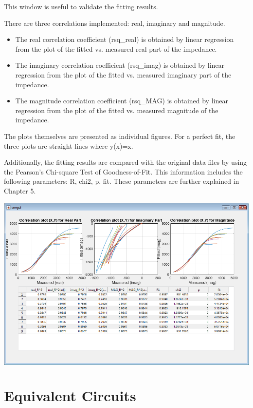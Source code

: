 \documentclass[10pt,a4paper,oneside]{book}
\begin{document}
This window is useful to validate the fitting results. 

There are three correlations implemented: real, imaginary and magnitude. 

\begin{itemize}
\item The real correlation coefficient (rsq\_real) is obtained by linear regression from the plot of the fitted vs. measured real part of the impedance. 
\item The imaginary correlation coefficient (rsq\_imag) is obtained by linear regression from the plot of the fitted vs. measured imaginary part of the impedance.
\item The magnitude correlation coefficient (rsq\_MAG) is obtained by linear regression from the plot of the fitted vs. measured magnitude of the impedance.	
\end{itemize}

The plots themselves are presented as individual figures. For a perfect fit, the three plots are straight lines where y(x)=x.

Additionally, the fitting results are compared with the original data files by using the Pearson's Chi-square Test of Goodness-of-Fit. This information includes the following parameters: R, chi2, p, fit. These parameters are further explained in Chapter 5.

\includegraphics[width=15cm]{correlations.png}






\chapter{Equivalent Circuits}
\end{document}
